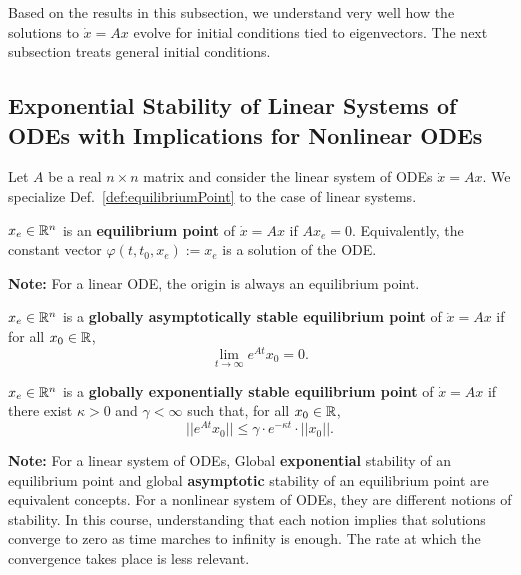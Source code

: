 \bigskip

Based on the results in this subsection, we understand very well how the solutions to $\dot{x} = Ax$ evolve for initial conditions tied to eigenvectors. The next subsection treats general initial conditions.

\subsection{Exponential Stability of Linear Systems of ODEs with Implications for Nonlinear ODEs}
\label{sec:ExponentialStabilityLTIodes}

\bigskip
\begin{tcolorbox}[colback=mylightblue, title = {\bf Equilibrium Points and Stability Properties}, breakable]
%
Let $A$ be a real $n \times n$ matrix and consider the linear system of ODEs $\dot{x} = Ax$. We specialize Def.~\ref{def:equilibriumPoint} to the case of linear systems.

\begin{definition}
\label{def:EquilibriumPoint}
 $x_e \in \mathbb R^n$ is an \textbf{equilibrium point} of $\dot{x} = Ax$ if $Ax_e=0$. Equivalently, the constant vector $\varphi(t, t_0, x_e):=x_e$ is a solution of the ODE. \\
\end{definition}
 \vspace*{.1cm}
\textbf{Note:} For a linear ODE, the origin is always an equilibrium point.


\bigskip

\begin{definition}
\label{def:AsymptoticStability}
 $x_e \in \mathbb R^n$ is a \textbf{globally asymptotically stable equilibrium point} of $\dot{x} = Ax$ if for all $x_0\in  \mathbb R$,
 $$\lim_{t \to \infty} e^{At} x_0 = 0.$$
\end{definition}
 \bigskip
\begin{definition}
\label{def:ExponentialStability}
 $x_e \in \mathbb R^n$ is a \textbf{globally exponentially stable equilibrium point} of $\dot{x} = Ax$ if there exist $\kappa >0$ and $\gamma< \infty$ such that, for all $x_0\in  \mathbb R$, 
 $$ ||e^{At} x_0|| \le \gamma\cdot e^{-\kappa t} \cdot ||x_0||. $$
\end{definition}
\bigskip
\textbf{Note:}  For a linear system of ODEs, Global \textbf{exponential} stability of an equilibrium point and global \textbf{asymptotic} stability of an equilibrium point are equivalent concepts. For a nonlinear system of ODEs, they are different notions of stability. In this course, understanding that each notion implies that solutions converge to zero as time marches to infinity is enough. The rate at which the convergence takes place is less relevant. 
\end{tcolorbox}

